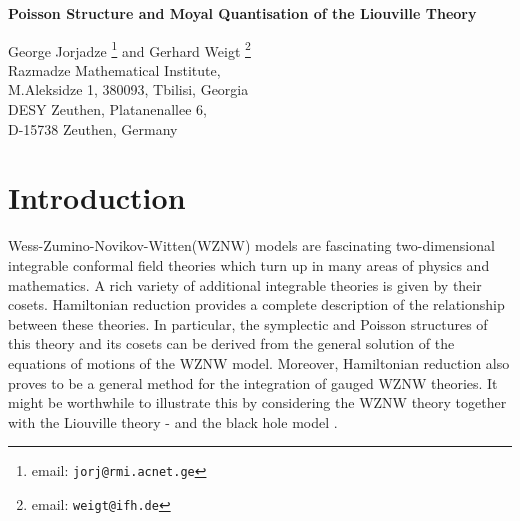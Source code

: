 \documentclass[a4paper,12pt]{article}
\renewcommand{\title}[1]{\begin{center}\bf\Large #1\end{center}}
\renewcommand{\author}[1]{\begin{center}\large #1\end{center}}
\providecommand{\rr}{\mathbb{R}}
\begin{document}
\title{Poisson Structure and Moyal Quantisation of the Liouville
 Theory }
\author{
 George Jorjadze\coordHE{}
\footnote{email: \tt jorj@rmi.acnet.ge}
 and Gerhard Weigt\myHighlight{${}^b$}\coordHE{}
\footnote{email: \tt weigt@ifh.de} \\
{\small\myHighlight{${}^a$}\coordHE{}Razmadze Mathematical Institute,}\\
  {\small M.Aleksidze 1, 380093, Tbilisi, Georgia}\\
{\small\myHighlight{${}^b$}\coordHE{}DESY Zeuthen, Platanenallee 6,}\\
{\small D-15738 Zeuthen, Germany}}


\begin{abstract}
\noindent
The symplectic and Poisson structures of the Liouville theory are
derived from the symplectic form of the \myHighlight{$SL(2,\rr)$}\coordHE{} WZNW theory by
gauge invariant Hamiltonian reduction. Causal non-equal time Poisson
brackets for a Liouville field are presented.  Using the symmetries of
the Liouville theory, symbols of chiral fields are constructed and
their \myHighlight{$*$}\coordHE{}-products calculated. Quantum deformations consistent with
the canonical quantisation result, and a non-equal time commutator
is given.
\end{abstract}

\baselineskip=20pt

\vspace{0.3cm}

\setcounter{equation}{0}
\section{Introduction}

\noindent
Wess-Zumino-Novikov-Witten(WZNW) models \cite{WZNW} are fascinating
two-dimensional integrable conformal field theories which turn
up in many areas of physics and mathematics. A rich variety of additional
integrable theories is given by their cosets.  Hamiltonian
reduction \cite{Balog, FJW} provides a complete description of the
relationship between these theories.
In particular, the symplectic and Poisson
structures of this theory \cite{Goddard, Gawedzki} and its cosets can
be derived from the general solution of the equations of motions
of the WZNW model.
Moreover,  Hamiltonian reduction also proves
to be a general method for the integration of gauged WZNW
theories. It might be worthwhile to illustrate this by considering
the \myHighlight{$SL(2,\rr)$}\coordHE{} WZNW theory together with the Liouville theory
\cite{Thorn}-\cite{OW} and the \myHighlight{$SL(2,\rr)/U(1)$}\coordHE{} black hole model
\cite{BCR, FJW}.
\end{document}
